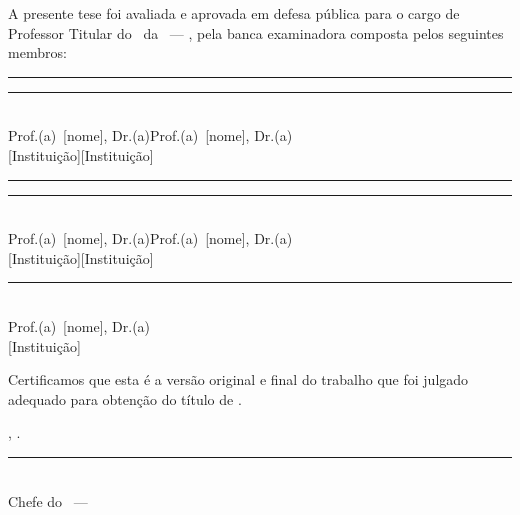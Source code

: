 \begingroup
\thispagestyle{empty}
\begin{center}
  \vspace*{1cm}

  {\scshape\Large \myName}\par
  \vspace{1.5cm}

  {\spacedallcaps{\myTitle}}\par
  \vspace{0.4cm}
  {\large\textit{\mySubtitle}}\par
  \vspace{1.5cm}

  \noindent
  A presente tese foi avaliada e aprovada em defesa pública para
  o cargo de Professor Titular do \myFaculty\ da \myUni\ ---
  \myDepartment, pela banca examinadora composta pelos seguintes membros:\par
  \vspace{1.5cm}
\end{center}

\noindent
\rule{0.45\textwidth}{0.4pt}\hfill\rule{0.45\textwidth}{0.4pt}\\[2pt]
{\small Prof.(a)\ [nome], Dr.(a)}\hfill{\small Prof.(a)\ [nome], Dr.(a)}\\
{\small [Instituição]}\hfill{\small [Instituição]}

\vspace{1.2cm}

\noindent
\rule{0.45\textwidth}{0.4pt}\hfill\rule{0.45\textwidth}{0.4pt}\\[2pt]
{\small Prof.(a)\ [nome], Dr.(a)}\hfill{\small Prof.(a)\ [nome], Dr.(a)}\\
{\small [Instituição]}\hfill{\small [Instituição]}

\vspace{1.2cm}

\noindent
\begin{center}
\rule{0.45\textwidth}{0.4pt}\\[2pt]
{\small Prof.(a)\ [nome], Dr.(a)}\\
{\small [Instituição]}
\end{center}

\vspace{1.5cm}

\noindent
Certificamos que esta é a versão original e final do trabalho que foi
julgado adequado para obtenção do título de \textbf{\myDegree}.

\vspace{2cm}

\begin{center}
  \myLocation, \myTime.

  \vspace{2cm}

  \rule{8cm}{0.4pt}\\[4pt]
  {\small Chefe do \myFaculty\ --- \myUni}
\end{center}
\endgroup
